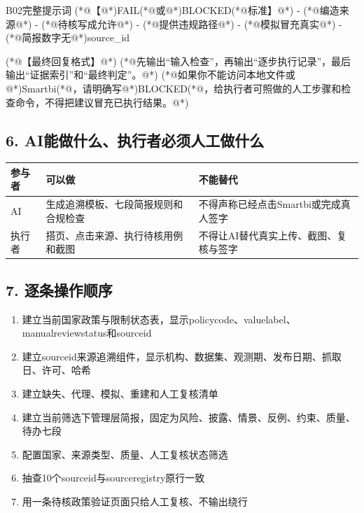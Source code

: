 \documentclass[UTF8,openany,zihao=-4]{ctexbook}
\renewcommand{\_}{\textunderscore\allowbreak}
\begin{document}
\begin{PromptBox}{B02完整提示词}
(*@{\promptcjk 【}@*)FAIL(*@{\promptcjk 或}@*)BLOCKED(*@{\promptcjk 标准】}@*)
- (*@{\promptcjk 编造来源}@*)
- (*@{\promptcjk 待核写成允许}@*)
- (*@{\promptcjk 提供违规路径}@*)
- (*@{\promptcjk 模拟冒充真实}@*)
- (*@{\promptcjk 简报数字无}@*)source_id

(*@{\promptcjk 【最终回复格式】}@*)
(*@{\promptcjk 先输出“输入检查”，再输出“逐步执行记录”，最后输出“证据索引”和“最终判定”。}@*)
(*@{\promptcjk 如果你不能访问本地文件或}@*)Smartbi(*@{\promptcjk ，请明确写}@*)BLOCKED(*@{\promptcjk ，给执行者可照做的人工步骤和检查命令，不得把建议冒充已执行结果。}@*)
\end{PromptBox}

\subsection*{6. AI能做什么、执行者必须人工做什么}
\noindent\begin{tabularx}{\textwidth}{@{}p{}XX@{}}
\toprule
\textbf{参与者} & \textbf{可以做} & \textbf{不能替代} \\
\midrule
AI & 生成追溯模板、七段简报规则和合规检查 & 不得声称已经点击Smartbi或完成真人签字 \\
执行者 & 搭页、点击来源、执行待核用例和截图 & 不得让AI替代真实上传、截图、复核与签字 \\
\bottomrule
\end{tabularx}

\subsection*{7. 逐条操作顺序}
\begin{enumerate}
\item 建立当前国家政策与限制状态表，显示policy\_code、value\_label、manual\_review\_status和source\_id
\item 建立source\_id来源追溯组件，显示机构、数据集、观测期、发布日期、抓取日、许可、哈希
\item 建立缺失、代理、模拟、重建和人工复核清单
\item 建立当前筛选下管理层简报，固定为风险、披露、情景、反例、约束、质量、待办七段
\item 配置国家、来源类型、质量、人工复核状态筛选
\item 抽查10个source\_id与source\_registry原行一致
\item 用一条待核政策验证页面只给人工复核、不输出绕行
\end{enumerate}
\end{document}
